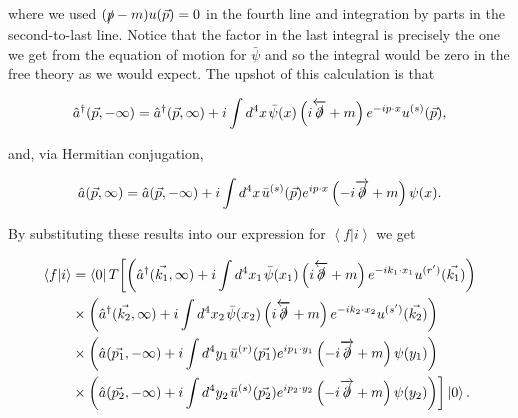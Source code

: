 where we used $(\slashed{p} - m)u(\vec{p}) = 0$ in the fourth line and integration by parts in the second-to-last line. Notice that the factor in the last integral is precisely the one we get from the equation of motion for $\bar{\psi}$ and so the integral would be zero in the free theory as we would expect. The upshot of this calculation is that

\begin{equation}
\hat{a}^\dagger(\vec{p},-\infty) = \hat{a}^\dagger(\vec{p},\infty) + i \int d^4 x \hspace{1pt} \bar{\psi}(x) \left(i \overleftarrow{\slashed{\partial}} + m \right) e^{- i p \cdot x} u^{(s)}(\vec{p}),
\end{equation}

and, via Hermitian conjugation,

\begin{equation}
\hat{a}(\vec{p},\infty) = \hat{a}(\vec{p},-\infty) + i \int d^4 x \hspace{1pt} \bar{u}^{(s)}(\vec{p}) e^{i p \cdot x} \left(-i \overrightarrow{\slashed{\partial}} + m \right)  \psi(x).
\end{equation} %

By substituting these results into our expression for $\left<f | i \right>$ we get

\begin{equation}
\begin{split}
\left<f | i \right> & =  \left < 0 \right | T \biggl[ \left (\hat{a}^\dagger(\vec{k_1},\infty) + i \int d^4 x_1 \hspace{1pt} \bar{\psi}(x_1) \left(i \overleftarrow{\slashed{\partial}} + m \right) e^{- i k_1 \cdot x_1} u^{(r')}(\vec{k_1}) 
 \right ) \\
  & \times  \left (\hat{a}^\dagger(\vec{k_2},\infty) + i \int d^4 x_2 \hspace{1pt} \bar{\psi}(x_2) \left(i \overleftarrow{\slashed{\partial}} + m \right) e^{- i k_2 \cdot x_2} u^{(s')}(\vec{k_2}) 
 \right ) \\
  & \times  \left (\hat{a}(\vec{p_1},-\infty) + i \int d^4 y_1 \hspace{1pt} \bar{u}^{(r)}(\vec{p_1}) e^{i p_1 \cdot y_1} \left(-i \overrightarrow{\slashed{\partial}} + m \right)  \psi(y_1)
 \right ) \\
  & \times   \left (\hat{a}(\vec{p_2},-\infty) + i \int d^4 y_2 \hspace{1pt} \bar{u}^{(s)}(\vec{p_2}) e^{i p_2 \cdot y_2} \left(-i \overrightarrow{\slashed{\partial}} + m \right)  \psi(y_2)
 \right ) \biggr ] \left| 0 \right>.
\end{split}
\end{equation}

